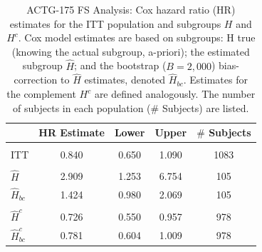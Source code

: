 \documentclass[9pt]{article}\usepackage[]{graphicx}\usepackage[]{xcolor}
\theoremstyle{definition}
\theoremstyle{remark}
\begin{document}
\begin{table}[!h]

\caption{\label{tab:fs_tab}\label{tab:actg} ACTG-175 FS Analysis: Cox hazard ratio (HR) estimates for the ITT population and subgroups $H$ and $H^{c}$.
Cox model estimates are based on subgroups: H true (knowing the actual subgroup, a-priori); the estimated subgroup $\hat{H}$; and 
the bootstrap ($B=2,000$) bias-correction to $\hat{H}$ estimates, denoted $\hat{H}_{bc}$.  Estimates for the complement $H^{c}$ are defined analogously.
The number of subjects in each population ($\#$ Subjects) are listed.}
\centering
\fontsize{9}{11}\selectfont
\begin{tabular}[t]{lcccc}
\toprule
  & HR Estimate & Lower & Upper & $\#$ Subjects\\
\midrule
\addlinespace[0.3em]
\multicolumn{5}{l}{\textbf{ITT}}\\
\hspace{1em}ITT & 0.840 & 0.650 & 1.090 & 1083\\
\addlinespace[0.3em]
\multicolumn{5}{l}{\textbf{H subgroup estimates}}\\
\hspace{1em}$\hat{H}$ & 2.909 & 1.253 & 6.754 & 105\\
\hspace{1em}$\hat{H}_{bc}$ & 1.424 & 0.980 & 2.069 & 105\\
\addlinespace[0.3em]
\multicolumn{5}{l}{\textbf{H-complement subgroup estimates}}\\
\hspace{1em}$\hat{H}^{c}$ & 0.726 & 0.550 & 0.957 & 978\\
\hspace{1em}$\hat{H}^{c}_{bc}$ & 0.781 & 0.604 & 1.009 & 978\\
\bottomrule
\end{tabular}
\end{table}
\end{document}
